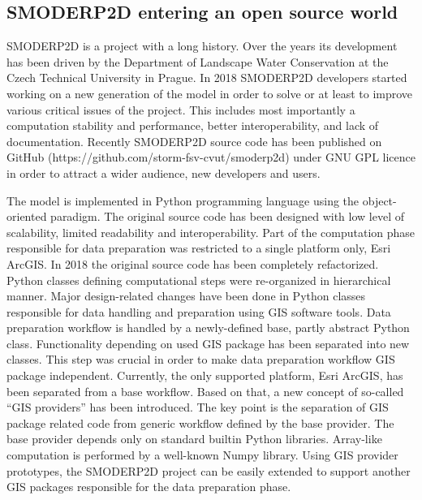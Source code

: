 \subsection{SMODERP2D entering an open source world}

SMODERP2D is a project with a long history. Over the years its
development has been driven by the Department of Landscape Water
Conservation at the Czech Technical University in Prague. In 2018
SMODERP2D developers started working on a new generation of the model
in order to solve or at least to improve various critical issues of
the project. This includes most importantly a computation stability
and performance, better interoperability, and lack of
documentation. Recently SMODERP2D source code has been published on
GitHub (https://github.com/storm-fsv-cvut/smoderp2d) under GNU GPL
licence in order to attract a wider audience, new developers and
users.

The model is implemented in Python programming language using the
object-oriented paradigm. The original source code has been designed
with low level of scalability, limited readability and
interoperability. Part of the computation phase responsible for data
preparation was restricted to a single platform only, Esri ArcGIS. In
2018 the original source code has been completely refactorized. Python
classes defining computational steps were re-organized in hierarchical
manner. Major design-related changes have been done in Python classes
responsible for data handling and preparation using GIS software
tools. Data preparation workflow is handled by a newly-defined base,
partly abstract Python class. Functionality depending on used GIS
package has been separated into new classes. This step was crucial in
order to make data preparation workflow GIS package
independent. Currently, the only supported platform, Esri ArcGIS, has
been separated from a base workflow. Based on that, a new concept of
so-called “GIS providers” has been introduced. The key point is the
separation of GIS package related code from generic workflow defined
by the base provider. The base provider depends only on standard
builtin Python libraries. Array-like computation is performed by a
well-known Numpy library. Using GIS provider prototypes, the SMODERP2D
project can be easily extended to support another GIS packages
responsible for the data preparation phase.

